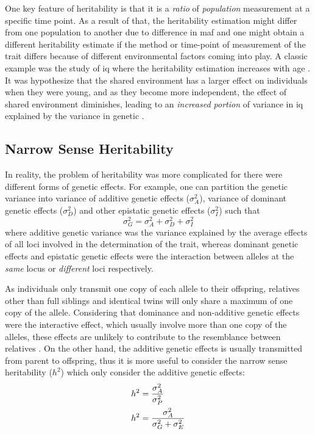 	One key feature of heritability is that it is a \emph{ratio} of \emph{population} measurement at a specific time point.
	As a result of that, the heritability estimation might differ from one population to another due to difference in \gls{maf} and one might obtain a different heritability estimate if the method or time-point of measurement of the trait differs because of different environmental factors coming into play.
	A classic example was the study of \gls{iq} where the heritability estimation increases with age \citep{Bouchard2013}.
	It was hypothesize that the shared environment has a larger effect on individuals when they were young, and as they become more independent, the effect of shared environment diminishes, leading to an \emph{increased portion} of variance in \gls{iq} explained by the variance in genetic \citep{Bouchard2013}. 
	
	\subsection{Narrow Sense Heritability}
	In reality, the problem of heritability was more complicated for there were different forms of genetic effects. 
	For example, one can partition the genetic variance into variance of additive genetic effects ($\sigma_A^2$), variance of dominant genetic effects ($\sigma_D^2$) and other epistatic genetic effects ($\sigma_I^2$) such that
	$$
	\sigma_G^2=\sigma_A^2+\sigma_D^2+\sigma_I^2
	$$
	where additive genetic variance was the variance explained by the average effects of all loci involved in the determination of the trait, whereas dominant genetic effects and epistatic genetic effects were the interaction between alleles at the \emph{same} locus or \emph{different} loci respectively.
	
	As individuals only transmit one copy of each allele to their offspring, relatives other than full siblings and identical twins will only share a maximum of one copy of the allele.
	Considering that dominance and non-additive genetic effects were the interactive effect, which usually involve more than one copy of the alleles, these effects are unlikely to contribute to the resemblance between relatives \citep{Visscher2008}.
	On the other hand, the additive genetic effects is usually transmitted from parent to offspring, thus it is more useful to consider the narrow sense heritability ($h^2$) which only consider the additive genetic effects:
	\begin{align}
	h^2&=\frac{\sigma_A^2}{\sigma_P^2} \notag\\
	h^2&=\frac{\sigma_A^2}{\sigma_G^2+\sigma_E^2}
	\label{eq:narrowHeritability}
	\end{align}
	
